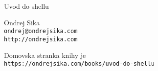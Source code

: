 \maketitle

\newpage

$$$$

\vfill

{\LARGE Uvod do shellu}
\vspace{0.3cm}

{\large Ondrej Sika}\\
\texttt{ondrej@ondrejsika.com}\\
\texttt{http://ondrejsika.com}
\vspace{0.8cm}

Domovska stranka knihy je\\
\texttt{https://ondrejsika.com/books/uvod-do-shellu}

\newpage

$$$$

\tableofcontents

